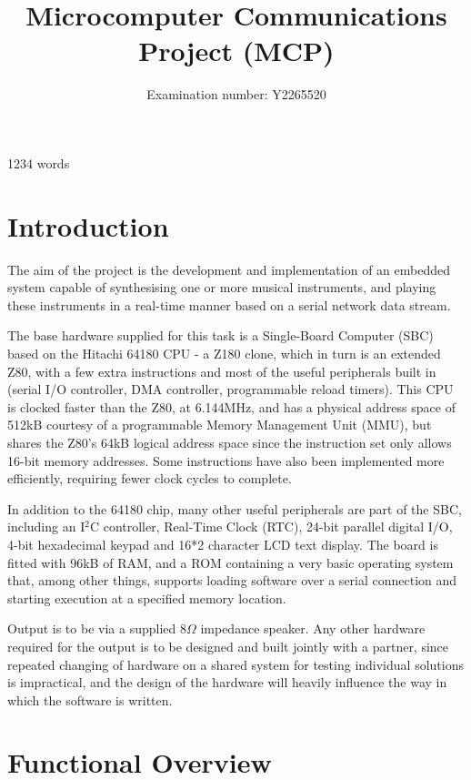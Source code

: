 \documentclass[a4paper,10pt]{article}
\title{Microcomputer Communications Project (MCP)}
\author{Examination number: Y2265520}
\begin{document}
\maketitle
\begin{center}
1234 words
\end{center}
\pagebreak
\tableofcontents

\pagebreak
\section{Introduction}

The aim of the project is the development and implementation of an embedded system capable of 
synthesising one or more musical instruments, and playing these instruments in a real-time manner 
based on a serial network data stream.

The base hardware supplied for this task is a Single-Board Computer (SBC) based on the Hitachi 64180 
CPU - a Z180 clone, which in turn is an extended Z80, with a few extra instructions and most of the 
useful peripherals built in (serial I/O controller, DMA controller, programmable reload timers).  
This CPU is clocked faster than the Z80, at 6.144MHz, and has a physical address space of 512kB 
courtesy of a programmable Memory Management Unit (MMU), but shares the Z80's 64kB logical address 
space since the instruction set only allows 16-bit memory addresses.  Some instructions have also 
been implemented more efficiently, requiring fewer clock cycles to complete.

In addition to the 64180 chip, many other useful peripherals are part of the SBC, including an 
I$^{2}$C controller, Real-Time Clock (RTC), 24-bit parallel digital I/O, 4-bit hexadecimal keypad 
and 16*2 character LCD text display.  The board is fitted with 96kB of RAM, and a ROM containing a 
very basic operating system that, among other things, supports loading software over a serial 
connection and starting execution at a specified memory location.

Output is to be via a supplied $8\Omega$ impedance speaker.  Any other hardware required for the 
output is to be designed and built jointly with a partner, since repeated changing of hardware on a 
shared system for testing individual solutions is impractical, and the design of the hardware will 
heavily influence the way in which the software is written.

\pagebreak
\section{Functional Overview}
\end{document}
